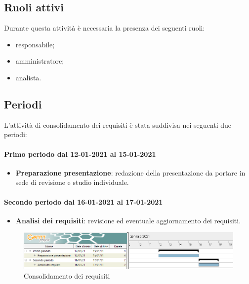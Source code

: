 	\subsection{Ruoli attivi}
	Durante questa attività è necessaria la presenza dei seguenti ruoli:
	\begin{itemize}
	\item responsabile;
	\item amministratore;
	\item analista.
	\end{itemize}

	\subsection{Periodi}
	L'attività di consolidamento dei requisiti è stata suddivisa nei seguenti due periodi:
	
	\paragraph{Primo periodo dal 12-01-2021 al 15-01-2021}
	\begin{itemize}
	
	\item \textbf{Preparazione presentazione}: redazione della presentazione da portare in sede di revisione e
	studio individuale.
	
	\end{itemize}	
	
	\paragraph{Secondo periodo dal 16-01-2021 al 17-01-2021}
	\begin{itemize}
		
	\item \textbf{Analisi dei requisiti}: revisione ed eventuale aggiornamento dei requisiti.
		
	\end{itemize}

	\newpage
	
	\begin{landscape}
		\begin{figure}[h!]
			\includegraphics[width=24cm]{images/2_Consolidamento_dei_requisiti.png}
			\caption{Consolidamento dei requisiti}
		\end{figure}
	\end{landscape}


